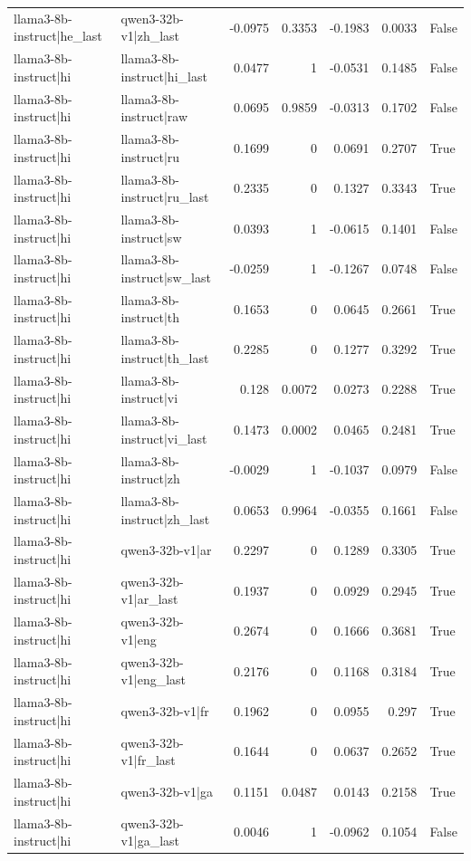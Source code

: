 \begin{table}
\begin{tabular}{l l r r r r l}
llama3-8b-instruct|he_last & qwen3-32b-v1|zh_last & -0.0975 & 0.3353 & -0.1983 & 0.0033 & False \\
llama3-8b-instruct|hi & llama3-8b-instruct|hi_last & 0.0477 & 1 & -0.0531 & 0.1485 & False \\
llama3-8b-instruct|hi & llama3-8b-instruct|raw & 0.0695 & 0.9859 & -0.0313 & 0.1702 & False \\
llama3-8b-instruct|hi & llama3-8b-instruct|ru & 0.1699 & 0 & 0.0691 & 0.2707 & True \\
llama3-8b-instruct|hi & llama3-8b-instruct|ru_last & 0.2335 & 0 & 0.1327 & 0.3343 & True \\
llama3-8b-instruct|hi & llama3-8b-instruct|sw & 0.0393 & 1 & -0.0615 & 0.1401 & False \\
llama3-8b-instruct|hi & llama3-8b-instruct|sw_last & -0.0259 & 1 & -0.1267 & 0.0748 & False \\
llama3-8b-instruct|hi & llama3-8b-instruct|th & 0.1653 & 0 & 0.0645 & 0.2661 & True \\
llama3-8b-instruct|hi & llama3-8b-instruct|th_last & 0.2285 & 0 & 0.1277 & 0.3292 & True \\
llama3-8b-instruct|hi & llama3-8b-instruct|vi & 0.128 & 0.0072 & 0.0273 & 0.2288 & True \\
llama3-8b-instruct|hi & llama3-8b-instruct|vi_last & 0.1473 & 0.0002 & 0.0465 & 0.2481 & True \\
llama3-8b-instruct|hi & llama3-8b-instruct|zh & -0.0029 & 1 & -0.1037 & 0.0979 & False \\
llama3-8b-instruct|hi & llama3-8b-instruct|zh_last & 0.0653 & 0.9964 & -0.0355 & 0.1661 & False \\
llama3-8b-instruct|hi & qwen3-32b-v1|ar & 0.2297 & 0 & 0.1289 & 0.3305 & True \\
llama3-8b-instruct|hi & qwen3-32b-v1|ar_last & 0.1937 & 0 & 0.0929 & 0.2945 & True \\
llama3-8b-instruct|hi & qwen3-32b-v1|eng & 0.2674 & 0 & 0.1666 & 0.3681 & True \\
llama3-8b-instruct|hi & qwen3-32b-v1|eng_last & 0.2176 & 0 & 0.1168 & 0.3184 & True \\
llama3-8b-instruct|hi & qwen3-32b-v1|fr & 0.1962 & 0 & 0.0955 & 0.297 & True \\
llama3-8b-instruct|hi & qwen3-32b-v1|fr_last & 0.1644 & 0 & 0.0637 & 0.2652 & True \\
llama3-8b-instruct|hi & qwen3-32b-v1|ga & 0.1151 & 0.0487 & 0.0143 & 0.2158 & True \\
llama3-8b-instruct|hi & qwen3-32b-v1|ga_last & 0.0046 & 1 & -0.0962 & 0.1054 & False \\

\end{tabular}
\end{table}
